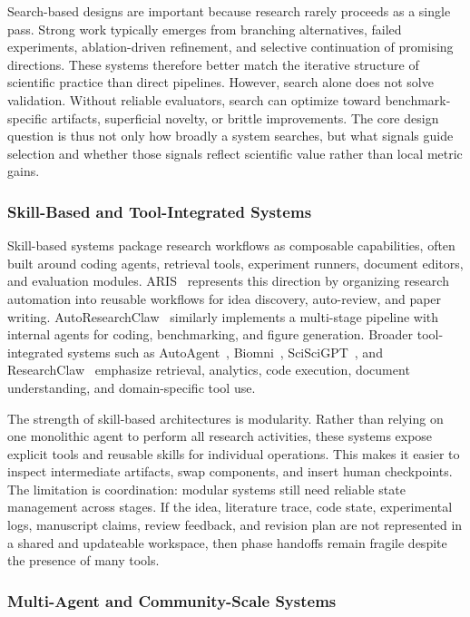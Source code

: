 Search-based designs are important because research rarely proceeds as a single pass. Strong work typically emerges from branching alternatives, failed experiments, ablation-driven refinement, and selective continuation of promising directions. These systems therefore better match the iterative structure of scientific practice than direct pipelines. However, search alone does not solve validation. Without reliable evaluators, search can optimize toward benchmark-specific artifacts, superficial novelty, or brittle improvements. The core design question is thus not only how broadly a system searches, but what signals guide selection and whether those signals reflect scientific value rather than local metric gains.

\subsubsection{Skill-Based and Tool-Integrated Systems}

Skill-based systems package research workflows as composable capabilities, often built around coding agents, retrieval tools, experiment runners, document editors, and evaluation modules. ARIS~\cite{aris2025} represents this direction by organizing research automation into reusable workflows for idea discovery, auto-review, and paper writing. AutoResearchClaw~\cite{autoresearchclaw2026} similarly implements a multi-stage pipeline with internal agents for coding, benchmarking, and figure generation. Broader tool-integrated systems such as AutoAgent~\cite{tang2025autodeepresearch}, Biomni~\cite{biomni2025}, SciSciGPT~\cite{sciscigpt2025}, and ResearchClaw~\cite{researchclaw2025} emphasize retrieval, analytics, code execution, document understanding, and domain-specific tool use.

The strength of skill-based architectures is modularity. Rather than relying on one monolithic agent to perform all research activities, these systems expose explicit tools and reusable skills for individual operations. This makes it easier to inspect intermediate artifacts, swap components, and insert human checkpoints. The limitation is coordination: modular systems still need reliable state management across stages. If the idea, literature trace, code state, experimental logs, manuscript claims, review feedback, and revision plan are not represented in a shared and updateable workspace, then phase handoffs remain fragile despite the presence of many tools.

\subsubsection{Multi-Agent and Community-Scale Systems}

